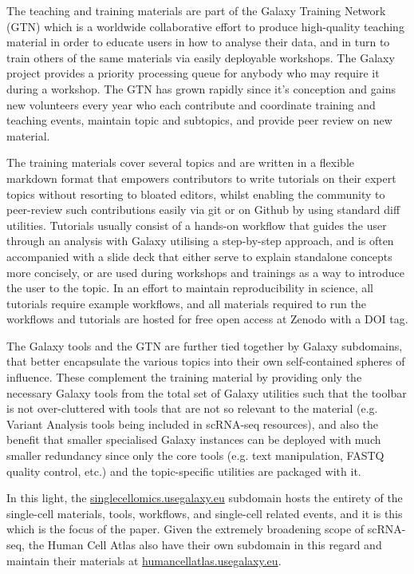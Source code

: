 \documentclass[a4paper,num-refs]{oup-contemporary}
\begin{document}
The teaching and training materials are part of the Galaxy Training Network (GTN) which is a worldwide collaborative effort to produce high-quality teaching material in order to educate users in how to analyse their data, and in turn to train others of the same materials via easily deployable workshops. The Galaxy project provides a priority processing queue for anybody who may require it during a workshop. The GTN has grown rapidly since it's conception and gains new volunteers every year who each contribute and coordinate training and teaching events, maintain topic and subtopics, and provide peer review on new material.

The training materials cover several topics and are written in a flexible markdown format that empowers contributors to write tutorials on their expert topics without resorting to bloated editors, whilst enabling the community to peer-review such contributions easily via git or on Github by using standard diff utilities. Tutorials usually consist of a hands-on workflow that guides the user through an analysis with Galaxy utilising a step-by-step approach, and is often accompanied with a slide deck that either serve to explain standalone concepts more concisely, or are used during workshops and trainings as a way to introduce the user to the topic. In an effort to maintain reproducibility in science,  all tutorials require example workflows, and all materials required to run the workflows and tutorials are hosted for free open access at Zenodo with a DOI tag.

The Galaxy tools and the GTN are further tied together by Galaxy subdomains, that better encapsulate the various topics into their own self-contained spheres of influence. These complement the training material by providing only the necessary Galaxy tools from the total set of Galaxy utilities such that the toolbar is not over-cluttered with tools that are not so relevant to the material (e.g. Variant Analysis tools being included in scRNA-seq resources), and also the benefit that smaller specialised Galaxy instances can be deployed with much smaller redundancy since only the core tools (e.g. text manipulation, FASTQ quality control, etc.) and the topic-specific utilities are packaged with it.

In this light, the \url{singlecellomics.usegalaxy.eu} subdomain hosts the entirety of the single-cell materials, tools, workflows, and single-cell related events, and it is this which is the focus of the paper. Given the extremely broadening scope of scRNA-seq, the Human Cell Atlas also have their own subdomain in this regard and maintain their materials at \url{humancellatlas.usegalaxy.eu}.
\end{document}
